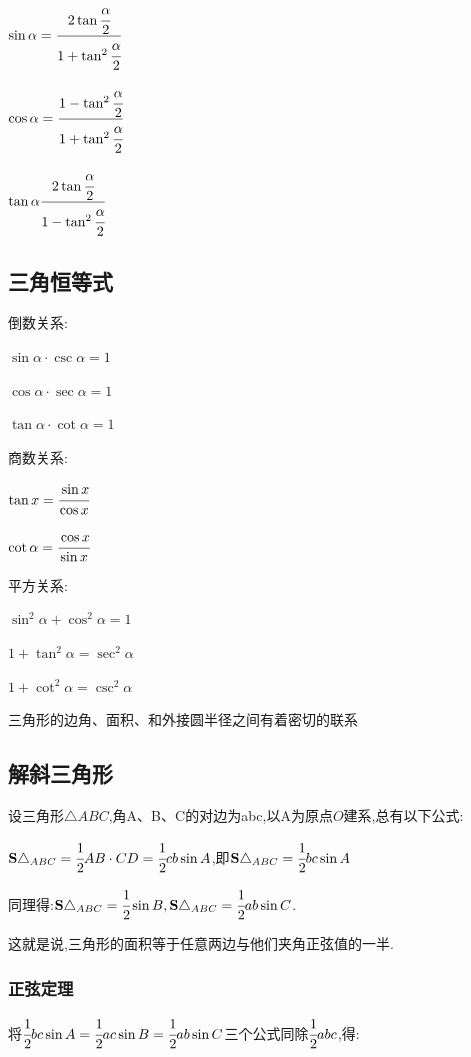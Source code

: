 \documentclass[UTF8,12pt]{ctexbook}
\begin{document}
{{{{    $\sin\alpha = \cfrac{2\tan\cfrac{\alpha}{2}}{1+\tan^2\cfrac{\alpha}{2}}$

    $\cos\alpha = \cfrac{1 - \tan^2\cfrac{\alpha}{2}}{1 + \tan^2\cfrac{\alpha}{2}}$

    $\tan\alpha \cfrac{2\tan\cfrac{\alpha}{2}}{1 - \tan^2\cfrac{\alpha}{2}}$
  }%

}%

\subsection{三角恒等式}{

  倒数关系:

  $\sin\alpha \cdot \csc\alpha = 1$

  $\cos\alpha \cdot \sec\alpha = 1$

  $\tan\alpha \cdot \cot\alpha = 1$

  商数关系:

  $\tan{x} = \cfrac{\sin{x}}{\cos{x}}$

  $\cot\alpha = \cfrac{\cos x}{\sin x}$

  平方关系:

  $\sin^2\alpha + \cos^2\alpha = 1$

  $1 + \tan^2\alpha = \sec^2\alpha$

  $1 + \cot^2\alpha = \csc^2\alpha$

}%

三角形的边角、面积、和外接圆半径之间有着密切的联系

\subsection{解斜三角形}{
设三角形$\triangle ABC$,角A、B、C的对边为abc,以A为原点$O$建系,总有以下公式:

$\mathbf{S}\triangle_{ABC} = \cfrac{1}{2}AB \cdot CD = \cfrac{1}{2}cb\sin A$,即$\mathbf{S}\triangle_{ABC} = \cfrac{1}{2}bc\sin A$

同理得:$\mathbf{S}\triangle_{ABC} = \cfrac{1}{2}\sin B, \mathbf{S}\triangle_{ABC} = \cfrac{1}{2}ab\sin C$.

这就是说,三角形的面积等于任意两边与他们夹角正弦值的一半.

\subsubsection{正弦定理}
将$\cfrac{1}{2}bc\sin A = \cfrac{1}{2}ac\sin B = \cfrac{1}{2}ab\sin C$三个公式同除$\cfrac{1}{2}abc$,得:

}}}
\end{document}
